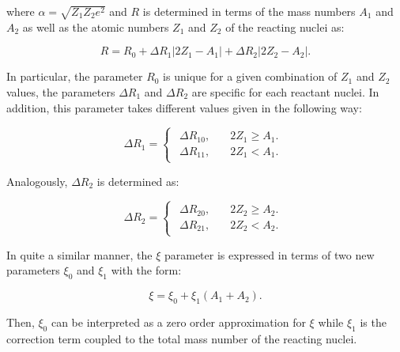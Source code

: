 \documentclass[openany]{book}
\begin{document}
where $\alpha = \sqrt{Z_1Z_2e^2}$ and $R$ is determined in terms of the mass numbers $A_1$ and $A_2$ as well as the atomic numbers $Z_1$ and $Z_2$ of the reacting nuclei as:

\begin{equation} \label{eq:potential_Yakovlev_R}
	R = R_0 + \Delta R_{1} |2Z_1 - A_1| + \Delta R_{2}|2Z_2 - A_2|.
\end{equation}

In particular, the parameter $R_0$ is unique for a given combination of $Z_1$ and $Z_2$ values,  the parameters $\Delta R_{1}$ and $\Delta R_{2}$ are specific for each reactant nuclei. In addition, this parameter takes different values given in the following way: 

\begin{equation} \label{eq:potential_Yakovlev_R1}
	\Delta R_1= 	\left\{\begin{array}{l}
		\begin{split}
			\Delta R_{10}, \quad & 2Z_1 \ge A_1.\\ 
			\Delta R_{11}, \quad & 2Z_1 < A_1.
		\end{split}
	\end{array}\right.
\end{equation}

Analogously, $\Delta R_2$ is determined as: 

\begin{equation} \label{eq:potential_Yakovlev_R2}
	\Delta R_2= 	\left\{\begin{array}{l}
		\begin{split}
			\Delta R_{20}, \quad & 2Z_2 \ge A_2.\\ 
			\Delta R_{21}, \quad & 2Z_2 < A_2.
		\end{split}
	\end{array}\right.
\end{equation}

In quite a similar manner, the $\xi$ parameter is expressed in terms of two new parameters $\xi_0$ and $\xi_1$ with the form:

\begin{equation} \label{eq:potential_Yakovlev_xi}
	\xi = 	\xi_0 + \xi_1(A_1 + A_2).
\end{equation}

Then, $\xi_0$ can be interpreted as a zero order approximation for $\xi$ while $\xi_1$ is the correction term coupled to the total mass number of the reacting nuclei. \\
\end{document}
